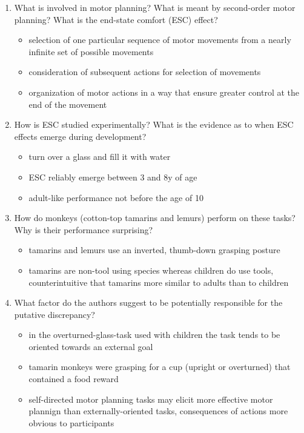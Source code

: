 \documentclass[12pt,english]{scrartcl}
\begin{document}
\begin{enumerate}
 \item What is involved in motor planning? What is meant by second-order motor planning? What is the end-state comfort (ESC) effect?

 \color{blue}
 \begin{itemize}
 \item selection of one particular sequence of motor movements from a nearly infinite set of possible movements
 \item consideration of subsequent actions for selection of movements
 \item organization of motor actions in a way that ensure greater control at the end of the movement
 \end{itemize}
  \color{black}

 \item How is ESC studied experimentally? What is the evidence as to when ESC effects emerge during development?

 \color{blue}
 \begin{itemize}
 \item turn over a glass and fill it with water
 \item ESC reliably emerge between 3 and 8y of age
 \item adult-like performance not before the age of 10
 \end{itemize}
  \color{black}

 \item How do monkeys (cotton-top tamarins and lemurs) perform on these tasks? Why is their performance surprising?

 \color{blue}
 \begin{itemize}
 \item tamarins and lemurs use an inverted, thumb-down grasping posture
 \item tamarins are non-tool using species whereas children do use tools, counterintuitive that tamarins more similar to adults than to children 
 \end{itemize}
  \color{black}

\item What factor do the authors suggest to be potentially responsible for the putative discrepancy?
 \color{blue}
 \begin{itemize}
 \item in the overturned-glass-task used with children the task tends to be oriented towards an external goal 
 \item tamarin monkeys were grasping for a cup (upright or overturned) that contained a food reward
 \item self-directed motor planning tasks may elicit more effective motor plannign than externally-oriented tasks, consequences of actions more obvious to participants
 \end{itemize}
  \color{black}


\end{enumerate}
\end{document}
